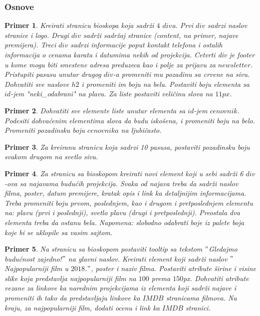 \documentclass[a4paper]{article}
\newtheorem{primer}{Primer}[section]
\begin{document}
\subsubsection{Osnove}
\begin{primer}
Kreirati stranicu bioskopa koja sadrži $4$ $div$a. Prvi $div$ sadrzi naslov stranice i logo. Drugi $div$ sadrži sadržaj stranice (content, na primer, najave premijera). Treci $div$ sadrzi informacije poput kontakt telefona i ostalih informacija o cenama karata i datumima nekih od projekcija. Cetvrti div je footer u kome mogu biti smestene adresa preduzeca kao i polje za prijavu za $newsletter$. Pristupiti pasusu unutar drugog $div$-a promeniti mu pozadinu sa crvene na sivu. Dohvatiti sve naslove $h2$ i promeniti im boju na belu. Postaviti boju elementa sa $id$-jem "neki\_odabrani" na plavu. Za liste postaviti veličinu slova na $11px$. 
\end{primer}

\begin{primer}
Dohvatiti sve elemente liste unutar elementa sa $id$-jem $cenovnik$. Podesiti dohvaćenim elementima slova da budu iskošena, i promeniti boju na belo. Promeniti pozadinsku boju $cenovnika$ na ljubičasto.
\end{primer}

\begin{primer}
Za kreiranu stranicu koja sadrzi 10 pasusa, postaviti pozadinsku boju svakom drugom na svetlo sivu.
\end{primer}

\begin{primer}
Za stranicu sa bioskopom kreirati novi element koji u sebi sadrži 6 $div$-ova sa najavama budućih projekcija. Svaka od najava treba da sadrži naslov filma, poster, datum premijere, kratak opis i link ka detaljnijim informacijama. Treba promeniti boju prvom, poslednjem, kao i drugom i pretposlednjem elementu na: plavu (prvi i poslednji), svetlo plavu (drugi i pretposlednji). Preostala dva elementa treba da ostanu bela. Napomena: slobodno odabrati boje iz palete boja koje bi se uklopile sa vasim sajtom.   
\end{primer}

\begin{primer}
Na stranicu sa bioskopom postaviti tooltip sa tekstom $"$Gledajmo budućnost zajedno!$"$ na glavni naslov. Kreirati element koji sadrži naslov $"$Najpopularniji film u $2018$.$"$, poster i naziv filma. Postaviti atribute širine i visine slike koja predstavlja najpopularniji film na $100$ prema $150$px. Dohvatiti atribute vezane za linkove ka narednim projekcijama iz elementa koji sadrži najave i promeniti ih tako da predstavljaju linkove ka $IMDB$ stranicama filmova. Na kraju, za najpopularniji film, dodati ocenu i link ka $IMDB$ stranici.  
\end{primer}
\end{document}
